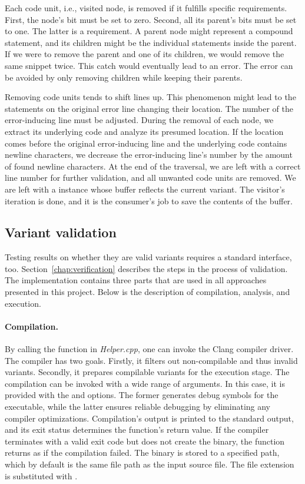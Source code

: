 Each code unit, i.e., visited node, is removed if it fulfills specific 
requirements. 
First, the node's bit must be set to zero. 
Second, all its parent's bits must be set to one. 
The latter is a  requirement. 
A parent node might represent a compound statement, and its children might 
be the individual statements inside the parent. 
If we were to remove the parent and one of its children, we would remove 
the same snippet twice. 
This catch would eventually lead to an error. 
The error can be avoided by only removing children while keeping their 
parents.

Removing code units tends to shift lines up. 
This phenomenon might lead to the statements on the original error line 
changing their location. 
The number of the error-inducing line must be adjusted. 
During the removal of each node, we extract its underlying code and analyze 
its presumed location. 
If the location comes before the original error-inducing line and 
the underlying code contains newline characters, we decrease 
the error-inducing line's number by the amount of found newline characters. 
At the end of the traversal, we are left with a correct line number for 
further validation, and all unwanted code units are removed. 
We are left with a  instance whose buffer reflects 
the current variant. 
The visitor's iteration is done, and it is the consumer's job to save 
the contents of the buffer.

\subsection{Variant validation}\label{chap:validationimplementation}

Testing results on whether they are valid variants requires a standard 
interface, too.
Section~\ref{chap:verification} describes the steps in the process 
of validation.
The implementation contains three parts that are used in all approaches 
presented in this project.
Below is the description of compilation, analysis, and execution.

\paragraph{Compilation.} By calling the  function in 
\emph{Helper.cpp}, one can invoke the Clang compiler driver.
The compiler has two goals.
Firstly, it filters out non-compilable and thus invalid variants.
Secondly, it prepares compilable variants for the execution stage.
The compilation can be invoked with a wide range of arguments.
In this case, it is provided with the  and  options.
The former generates debug symbols for the executable, while the latter 
ensures reliable debugging by eliminating any compiler optimizations.
Compilation's output is printed to the standard output, and its exit status 
determines the function's return value.
If the compiler terminates with a valid exit code but does not create 
the binary, the function returns as if the compilation failed.
The binary is stored to a specified path, which by default is the same file 
path as the input source file.
The file extension is substituted with .

